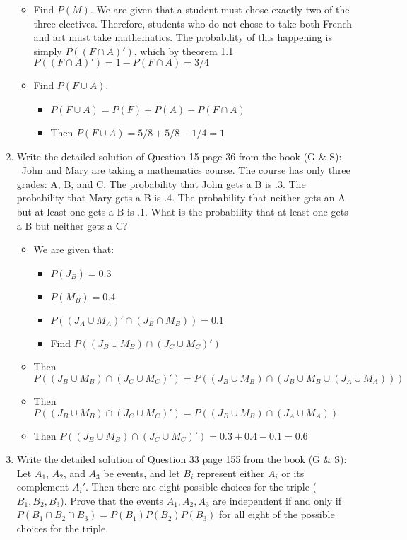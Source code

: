 \documentclass{article}
\begin{document}
\begin{enumerate}
\begin{itemize}
    \item Find $P(M)$. We are given that a student must chose exactly two of the three electives. Therefore, students who do not chose to take both French and art must take mathematics. The probability of this happening is simply $P((F \cap A)')$, which by theorem 1.1 $P((F \cap A)') = 1 - P(F \cap A) = 3/4$
    \item Find $P(F \cup A)$.
        \begin{itemize}
        \item $P(F \cup A) = P(F) + P(A) - P(F \cap A)$
        \item Then $P(F \cup A) = 5/8 + 5/8 - 1/4 = 1$
        \end{itemize}
    \end{itemize}
\item Write the detailed solution of Question 15 page 36 from the book (G \& S): \
    John and Mary are taking a mathematics course. The course has only three grades: A, B, and C. The probability that John gets a B is .3. The probability that Mary gets a B is .4. The probability that neither gets an A but at least one gets a B is .1. What is the probability that at least one gets a B but neither gets a C?
    \begin{itemize}
    \item We are given that:
        \begin{itemize}
        \item $P(J_B) = 0.3$
        \item $P(M_B) = 0.4$
        \item $P((J_A \cup M_A)' \cap (J_B \cap M_B)) = 0.1$
        \item Find $P((J_B \cup M_B) \cap (J_C \cup M_C)')$
        \end{itemize}
    \item Then $P((J_B \cup M_B) \cap (J_C \cup M_C)') = P((J_B \cup M_B) \cap (J_B \cup M_B \cup (J_A \cup M_A)))$
    \item Then $P((J_B \cup M_B) \cap (J_C \cup M_C)') = P((J_B \cup M_B) \cap (J_A \cup M_A))$
    \item Then $P((J_B \cup M_B) \cap (J_C \cup M_C)') = 0.3 + 0.4 - 0.1 = 0.6$
    \end{itemize}
\item Write the detailed solution of Question 33 page 155 from the book (G \& S): \\
    Let $A_1$, $A_2$, and $A_3$ be events, and let $B_i$ represent either $A_i$ or its complement $A_i'$. Then there are eight possible choices for the triple ($B_1, B_2, B_3$). Prove that the events $A_1, A_2, A_3$ are independent if and only if $P(B_1 \cap B_2 \cap B_3) = P(B_1)P(B_2)P(B_3)$ for all eight of the possible choices for the triple.

\end{enumerate}
\end{document}
